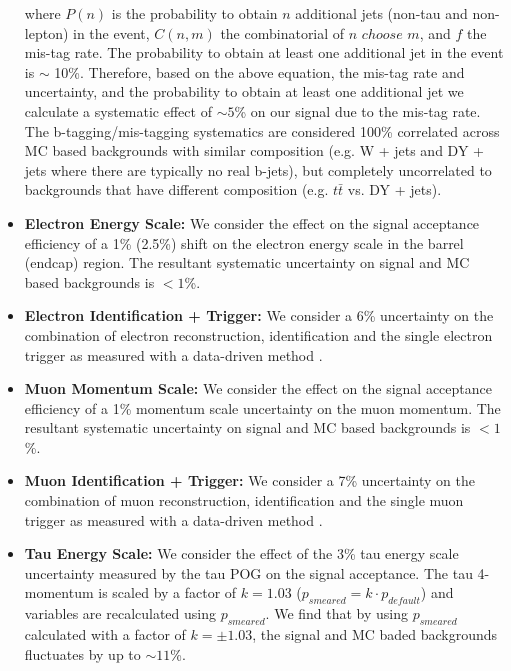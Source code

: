 \begin{itemize}
where $P(n)$ is the probability to obtain $n$ additional jets (non-tau and non-lepton) in the event, $C(n,m)$ the 
combinatorial of $n$ $choose$ $m$, and $f$ the mis-tag rate. The probability to 
obtain at least one additional jet in the event is $\sim$ 10\%. Therefore, based on the above equation, the 
mis-tag rate and uncertainty, and the probability to obtain at least one additional jet we calculate a 
systematic effect of $\sim 5$\% on our signal due to the mis-tag rate. The b-tagging/mis-tagging systematics are considered 100\% correlated across MC based 
backgrounds with similar composition (e.g. W + jets and DY + jets where there are typically no real b-jets), but completely uncorrelated to backgrounds that have 
different composition (e.g. $t\bar{t}$ vs. DY + jets).

  \item \textbf{Electron Energy Scale:} We consider the effect on the signal acceptance efficiency of a 1\% (2.5\%) shift on the electron
  energy scale in the barrel (endcap) region. The resultant systematic uncertainty on signal and MC based backgrounds is $< 1$\%.

  \item \textbf{Electron Identification + Trigger:} We consider a 6\% uncertainty on the combination of electron reconstruction, identification and the single 
electron trigger as measured with a data-driven method \cite{electron8TeV, ZpCMSmumuee13}.

  \item \textbf{Muon Momentum Scale:} We consider the effect on the signal acceptance efficiency of a 1\% momentum scale uncertainty on the
  muon momentum. The resultant systematic uncertainty on signal and MC based backgrounds is $< 1$\%.

  \item \textbf{Muon Identification + Trigger:} We consider a 7\% uncertainty on the combination of muon reconstruction, identification and the single muon 
trigger as measured with a data-driven method \cite{muon13TeV, ZpCMSmumuee13}.

  \item \textbf{Tau Energy Scale:} We consider the effect of the 3\% tau energy scale uncertainty measured by the tau 
POG on the signal acceptance. The tau 4-momentum is scaled by a factor of $k=1.03$ ($p_{smeared} = k \cdot 
p_{default}$) and variables are recalculated using $p_{smeared}$. We find that by using $p_{smeared}$ calculated with 
a factor of $k=\pm 1.03$, the signal and MC baded backgrounds fluctuates by up to $\sim 11$\%. 


\end{itemize}
